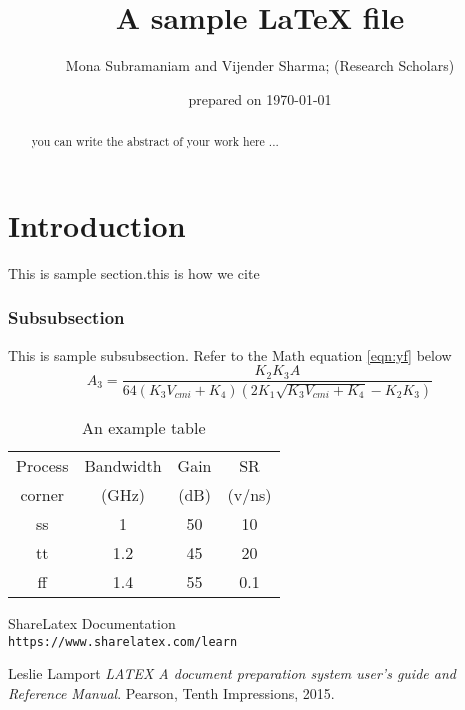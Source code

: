 \documentclass[onecolumn,12pt]{article}
\begin{document}
\title{A sample LaTeX file}
\author{ Mona Subramaniam and Vijender Sharma; (Research Scholars)}
\date{ prepared on \today}

\maketitle

\begin{abstract}
you can write the abstract of your work here ... 
\end{abstract}



\listoftables
\listoffigures

\newpage

\section{Introduction}
This is sample section.\newline this is how we cite\cite{LatexLearn}
\subsubsection{Subsubsection}
This is sample subsubsection.
\newline Refer to the Math equation \ref{eqn:yf} below
\begin{equation}
{A_3 = \frac{K_2 K_3 A}{64(K_3 V_{cmi}+K_4)(2K_1\sqrt{K_3 V_{cmi}+K_4}-K_2 K_3)}}
\label{eqn:yf}
\end{equation}




\begin{table}[h]
	\centering
	\caption{ An example table}
	\label{table:bwg}
\begin{tabular}{|c|c|c|c|}
	\hline
	Process & Bandwidth & Gain & SR\\
	corner & (GHz) & (dB) & (v/ns)\\
	\hline
	ss & 1 & 50 & 10 \\
	\hline
	tt & 1.2 & 45 & 20 \\
	\hline
	ff & 1.4 & 55 & 0.1 \\
	\hline
\end{tabular}

\end{table}




\begin{thebibliography}{9}

	ShareLatex Documentation
	\\\texttt{https://www.sharelatex.com/learn}
	
Leslie Lamport 
\textit{LATEX A document preparation system user's guide and Reference Manual}. 
Pearson, Tenth Impressions, 2015.


	
\end{thebibliography}
\end{document}
